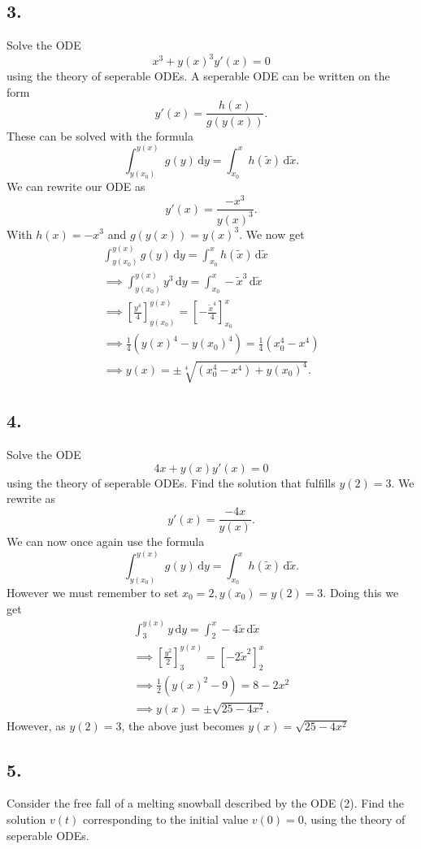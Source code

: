 \subsection*{3.} Solve the ODE
\[ 
x^3 + y(x)^3 y'(x) = 0
\]
using the theory of seperable ODEs.
\bigbreak
A seperable ODE can be written on the form
\[ 
y'(x) = \frac{h(x)}{g(y(x))}
.\]
These can be solved with the formula
\[ 
  \int_{y \left( x_0 \right)}^{y(x)} g(y) \, \mathrm{d}y = \int_{x_0}^{x} h \left( \tilde{x} \right) \, \mathrm{d} \tilde{x}
.\]
We can rewrite our ODE as
\[ 
y'(x) = \frac{-x^3}{y(x)^3}
.\]
With $h(x) = -x^3$ and $g(y(x)) = y(x)^3$. We now get
\begin{gather*}
  \int_{y(x_0)}^{y(x)} g(y) \, \mathrm{d}y = \int_{x_0}^{x} h(\tilde{x}) \, \mathrm{d}\tilde{x} \\
  \implies \int_{y(x_0)}^{y(x)} y^3 \, \mathrm{d}y = \int_{x_0}^{x} -\tilde{x}^3 \, \mathrm{d} \tilde{x} \\
  \implies \left[ \frac{y^{4}}{4} \right]_{y(x_0)}^{y(x)} = \left[ - \frac{\tilde{x}^{4}}{4} \right]_{x_0}^{x} \\
  \implies \frac{1}{4} \left( y(x)^{4} - y(x_0)^{4} \right) = \frac{1}{4} \left( x_0^{4} - x^{4} \right) \\
  \implies y(x) = \pm \sqrt[4]{\left( x_0^{4} - x^{4} \right) + y(x_0)^{4}}
.\end{gather*}


\subsection*{4.} Solve the ODE
\[ 
4x + y(x) y'(x) = 0
\]
using the theory of seperable ODEs. Find the solution that fulfills $y(2) = 3$.
\bigbreak
We rewrite as
\[ 
y'(x) = \frac{-4x}{y(x)}
.\]
We can now once again use the formula
\[ 
  \int_{y(x_0)}^{y(x)} g(y) \, \mathrm{d}y = \int_{x_0}^{x} h(\tilde{x}) \, \mathrm{d}\tilde{x}
.\]
However we must remember to set $x_0 = 2, y(x_0) = y(2) = 3$. Doing this we get
\begin{gather*}
\int_{3}^{y(x)} y \, \mathrm{d}y = \int_{2}^{x} -4 \tilde{x} \, \mathrm{d}\tilde{x} \\
\implies \left[ \frac{y^2}{2} \right]_3^{y(x)} = \left[ -2 \tilde{x}^2 \right]_2^{x} \\
\implies \frac{1}{2} \left( y(x)^2 - 9 \right) = 8 - 2x^2 \\
\implies y(x) = \pm \sqrt{25 - 4x^2}
.\end{gather*}
However, as $y(2) = 3$, the above just becomes $y(x) = \sqrt{25 - 4x^2}$


\subsection*{5.}
Consider the free fall of a melting snowball described by the ODE (2). Find the solution $v(t)$ corresponding to the initial value $v(0) = 0$, using the theory of seperable ODEs.
